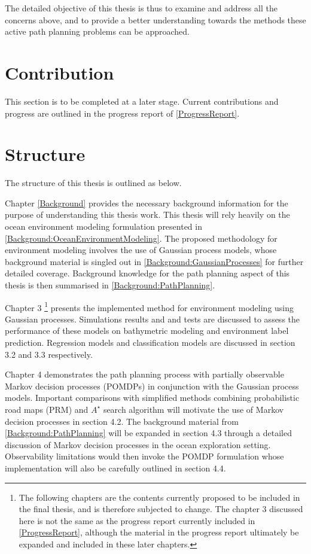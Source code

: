 		The detailed objective of this thesis is thus to examine and address all the concerns above, and to provide a better understanding towards the methods these active path planning problems can be approached.
		
	\section{Contribution}
	
		{\color{BurntOrange} This section is to be completed at a later stage. Current contributions and progress are outlined in the progress report of \cref{ProgressReport}}.
		
	\section{Structure}
	
		The structure of this thesis is outlined as below.
		
		Chapter \ref{Background} provides the necessary background information for the purpose of understanding this thesis work. This thesis will rely heavily on the ocean environment modeling formulation presented in \cref{Background:OceanEnvironmentModeling}. The proposed methodology for environment modeling involves the use of Gaussian process models, whose background material is singled out in \cref{Background:GaussianProcesses} for further detailed coverage. Background knowledge for the path planning aspect of this thesis is then summarised in \cref{Background:PathPlanning}.
				
		Chapter {\color{BurntOrange} 3} \footnote{ {\color{BurntOrange} The following chapters are the contents currently proposed to be included in the final thesis, and is therefore subjected to change. The chapter 3 discussed here is not the same as the progress report currently included in \cref{ProgressReport}, although the material in the progress report ultimately be expanded and included in these later chapters.} } presents the implemented method for environment modeling using Gaussian processes. Simulations results and and tests are discussed to assess the performance of these models on bathymetric modeling and environment label prediction. Regression models and classification models are discussed in section {\color{BurntOrange} 3.2} and {\color{BurntOrange} 3.3} respectively.
		
		Chapter {\color{BurntOrange} 4} demonstrates the path planning process with partially observable Markov decision processes (POMDPs) in conjunction with the Gaussian process models. Important comparisons with simplified methods combining probabilistic road maps (PRM) and $A^{\star}$ search algorithm will motivate the use of Markov decision processes in section {\color{BurntOrange} 4.2}. The background material from \cref{Background:PathPlanning} will be expanded in section {\color{BurntOrange} 4.3} through a detailed discussion of Markov decision processes in the ocean exploration setting. Observability limitations would then invoke the POMDP formulation whose implementation will also be carefully outlined in section {\color{BurntOrange} 4.4}.
		
